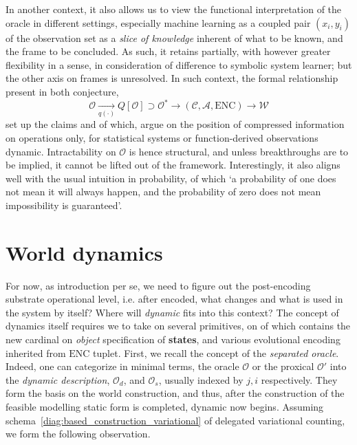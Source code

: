 In another context, it also allows us to view the functional interpretation of the oracle in different settings, especially machine learning as a coupled pair $(x_{i},y_{i})$ of the observation set as a \textit{slice of knowledge} inherent of what to be known, and the frame to be concluded. As such, it retains partially, with however greater flexibility in a sense, in consideration of difference to symbolic system learner; but the other axis on frames is unresolved. In such context, the formal relationship present in both conjecture, 
\begin{equation}
	\mathcal{O}\underset{q(\cdot)}{\longrightarrow}Q[\mathcal{O}] \supset \mathcal{O}^{*} \longrightarrow (\mathcal{C},\mathcal{A},\mathrm{ENC}) \longrightarrow \mathcal{W}
\end{equation}
set up the claims and of which, argue on the position of compressed information on operations only, for statistical systems or function-derived observations dynamic. Intractability on $\mathcal{O}$ is hence structural, and unless breakthroughs are to be implied, it cannot be lifted out of the framework. Interestingly, it also aligns well with the usual intuition in probability, of which `a probability of one does not mean it will always happen, and the probability of zero does not mean impossibility is guaranteed'. 
\section{World dynamics} 

For now, as introduction per se, we need to figure out the post-encoding substrate operational level, i.e. after encoded, what changes and what is used in the system by itself? Where will \textit{dynamic} fits into this context? The concept of dynamics itself requires we to take on several primitives, on of which contains the new cardinal on \textit{object} specification of \textbf{states}, and various evolutional encoding inherited from $\mathrm{ENC}$ tuplet. First, we recall the concept of the \textit{separated oracle}. Indeed, one can categorize in minimal terms, the oracle $\mathcal{O}$ or the proxical $\mathcal{O}'$ into the \textit{dynamic description}, $\mathcal{O}_{d}$, and $\mathcal{O}_{s}$, usually indexed by $j,i$ respectively. They form the basis on the world construction, and thus, after the construction of the feasible modelling static form is completed, dynamic now begins. Assuming schema~\ref{diag:based_construction_variational} of delegated variational counting, we form the following observation. 

